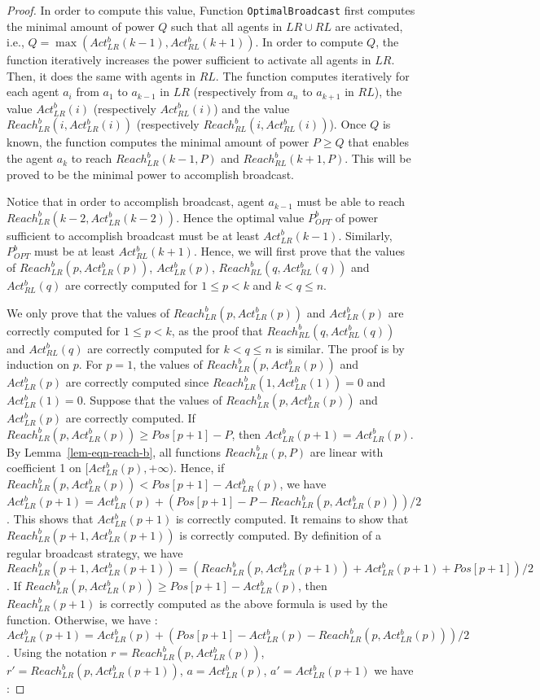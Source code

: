 \documentclass{article}
\newcommand\rblr{Reach_{LR}^b\xspace}
\newcommand\rbrl{Reach_{RL}^b\xspace}
\newcommand\abrl{Act_{RL}^b\xspace}
\newcommand\ablr{Act_{LR}^b\xspace}
\newcommand\Optbc{\mbox{{\tt OptimalBroadcast}}\xspace}
\begin{document}
\begin{proof}
In order to compute this value, Function \Optbc first computes the minimal amount of power $Q$ such that all agents in $LR\cup RL$ are activated, i.e., $Q = \max(\ablr(k-1),\abrl(k+1))$. In order to compute $Q$, the function iteratively increases the power sufficient to activate all agents in $LR$. Then, it does the same with agents in $RL$. The function computes iteratively for each agent $a_i$ from $a_1$ to $a_{k-1}$ in $LR$ (respectively from $a_{n}$ to $a_{k+1}$ in $RL$), the value $\ablr(i)$ (respectively $\abrl(i)$) and the value $\rblr(i,\ablr(i))$ (respectively $\rbrl(i,\abrl(i))$). Once $Q$ is known, the function computes the minimal amount of power $P\geq Q$ that enables the agent $a_k$ to reach $\rblr(k-1,P)$ and $\rbrl(k+1,P)$.
This will be proved to be the minimal power to accomplish broadcast.


Notice that in order to accomplish broadcast, agent $a_{k-1}$ must be able to reach $\rblr(k-2,\ablr({k-2}))$. Hence the optimal value $P_{OPT}^b$ of power sufficient to accomplish broadcast  must be at least $\ablr(k-1)$. Similarly, $P_{OPT}^b$ must be at least $\abrl(k+1)$. Hence, we will first prove that the values of $\rblr(p,\ablr(p))$, $\ablr({p})$, $\rbrl(q,\abrl({q}))$ and $\abrl({q})$ are correctly computed for $1\leq p<k$ and $k< q\leq n$. 

We only prove that the values of $\rblr(p,\ablr({p}))$ and $\ablr({p})$ 
are correctly computed for $1\leq p<k$, as the proof that $\rbrl(q,\abrl(q))$ and $\abrl(q)$ are correctly computed for $k< q\leq n$ is similar. The proof is by induction on $p$. For $p=1$, the values of $\rblr(p,\ablr({p}))$ and $\ablr(p)$ 
are correctly computed since $\rblr(1,\ablr({1}))=0$ and $\ablr({1})=0$. Suppose that the values of $\rblr(p,\ablr({p}))$ and $\ablr({p})$ are correctly computed. If $\rblr(p,\ablr(p))\geq Pos[p+1]-P$, then $\ablr(p+1)=\ablr(p)$. By Lemma~\ref{lem-eqn-reach-b}, all functions $\rblr(p,P)$ are linear with coefficient 1 on $[\ablr(p),+\infty)$. Hence, if $\rblr(p,\ablr(p))< Pos[p+1]-\ablr(p)$, we have $\ablr(p+1)=\ablr(p)+(Pos[p+1]-P-\rblr(p,\ablr(p)))/2$. This shows that $\ablr(p+1)$ is correctly computed. It remains to show that $\rblr(p+1,\ablr(p+1))$ is correctly computed. By definition of a regular broadcast strategy, we have 
$\rblr(p+1,\ablr(p+1))=(\rblr(p,\ablr(p+1)) + \ablr(p+1) + Pos[p+1])/2$. If $\rblr(p,\ablr(p))\geq Pos[p+1]-\ablr(p)$, then 
$\rblr(p+1)$ is correctly computed as the above formula is used by the function. Otherwise, we have :
$\ablr(p+1)=\ablr(p)+(Pos[p+1]-\ablr(p)-\rblr(p,\ablr(p)))/2$. Using the notation $r=\rblr(p,\ablr(p))$, $r'=\rblr(p,\ablr(p+1))$,
$a=\ablr(p)$, $a'=\ablr(p+1)$ we have :


\end{proof}
\end{document}

